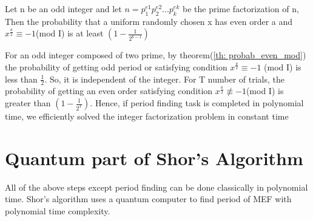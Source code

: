 \begin{theorem}
    Let n be an odd integer and let $n=p_1^{e1}p_2^{e2} . . . p_k^{ek}$ be the prime factorization of n, Then the probability that a uniform randomly chosen x has even order a and $x^{\frac{a}{2}} \equiv -1$(mod I) is at least $(1 - \frac{1}{2^{k-1}}) $ \cite{Nielsen2002}
    \label{th: probab_even_mod}
\end{theorem}

For an odd integer composed of two prime, by theorem(\ref{th: probab_even_mod}) the probability of getting odd period or satisfying condition $x^{\frac{a}{2}} \equiv - 1$ (mod I) is less than $\frac{1}{2}$. So, it is independent of the integer. For T number of trials, the probability of getting an even order satisfying condition $x^{\frac{a}{2}} \not \equiv - 1$(mod I) is greater than $(1 - \frac{1}{2^T}) $. Hence, if period finding task is completed in polynomial time, we efficiently solved the integer factorization problem in constant time


\section{Quantum part of Shor's Algorithm}
All of the above steps except period finding can be done classically in polynomial time. Shor's algorithm uses a quantum computer to find period of \acrshort{MEF} with polynomial time complexity.


